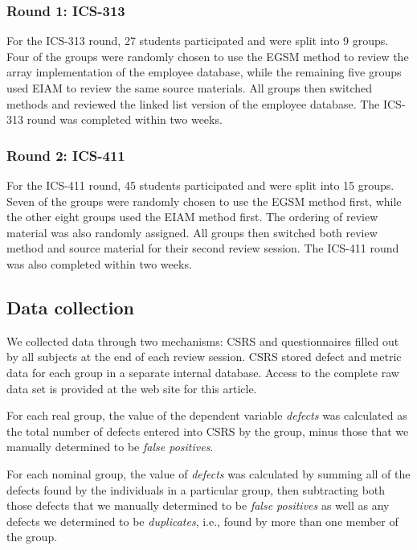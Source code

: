 \subsubsection{Round 1: ICS-313}

For the ICS-313 round, 27 students participated and were split into 9
groups. Four of the groups were randomly chosen to use the EGSM method to
review the array implementation of the employee database, while the remaining
five groups used EIAM to review the same source materials.  All groups then
switched methods and reviewed the linked list version of the employee
database. The ICS-313 round was completed within two weeks. 

\subsubsection{Round 2: ICS-411}

For the ICS-411 round, 45 students participated and were split into 15
groups. Seven of the groups were randomly chosen to use the EGSM method
first, while the other eight groups used the EIAM method first.  The 
ordering of review material was also randomly assigned.  All groups
then switched both review method and source material for their second
review session. The ICS-411 round was also completed within two weeks. 

\subsection{Data collection}

We collected data through two mechanisms: CSRS and questionnaires filled
out by all subjects at the end of each review session.  CSRS stored
defect and metric data for each group in a separate internal database.
Access to the complete raw data set is provided at the web site 
for this article. 

For each real group, the value of the dependent variable {\em defects} was
calculated as the total number of defects entered into CSRS by the group,
minus those that we manually determined to be {\em false positives}.

For each nominal group, the value of {\em defects} was calculated by summing
all of the defects found by the individuals in a particular group, then
subtracting both those defects that we manually determined to be {\em false
  positives} as well as any defects we determined to be {\em duplicates},
i.e., found by more than one member of the group. 

